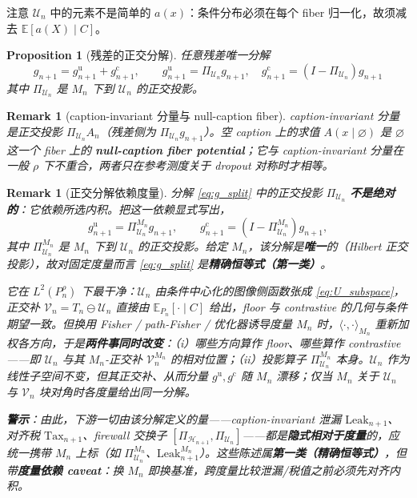 \documentclass[11pt,a4paper]{article}
\newtheorem{proposition}[theorem]{Proposition}
\newtheorem{remark}[theorem]{Remark}
\newcommand{\E}{\mathbb{E}}
\newcommand{\cH}{\mathcal{H}}
\newcommand{\cU}{\mathcal{U}}
\newcommand{\cV}{\mathcal{V}}
\newcommand{\ProjectOp}{\Pi}
\newcommand{\uu}{\mathrm{u}}
\newcommand{\cc}{\mathrm{c}}
\newcommand{\nul}{\varnothing}
\begin{document}
注意 $\cU_n$ 中的元素不是简单的 $a(x)$：条件分布必须在每个 fiber 归一化，故须减去 $\E[a(X)\mid C]$。

\begin{proposition}[残差的正交分解]\label{prop:orthogonal_split}
任意残差唯一分解
\begin{equation}\label{eq:g_split}
\boxed{
g_{n+1} = g^{\uu}_{n+1} + g^{\cc}_{n+1},\qquad g^{\uu}_{n+1}=\ProjectOp_{\cU_n}g_{n+1},\quad g^{\cc}_{n+1}=(I-\ProjectOp_{\cU_n})g_{n+1}
}
\end{equation}
其中 $\ProjectOp_{\cU_n}$ 是 $M_n$ 下到 $\cU_n$ 的正交投影。
\end{proposition}

\begin{remark}[caption-invariant 分量与 null-caption fiber]
caption-invariant 分量是正交投影 $\ProjectOp_{\cU_n}A_n$（残差侧为 $\ProjectOp_{\cU_n}g_{n+1}$）。空 caption 上的求值 $A(x\mid\nul)$ 是 $\nul$ 这一个 fiber 上的 \textbf{null-caption fiber potential}；它与 caption-invariant 分量在一般 $\rho$ 下不重合，两者只在参考测度关于 dropout 对称时才相等。
\end{remark}

\begin{remark}[正交分解依赖度量]\label{rem:metric_proj}
分解 \eqref{eq:g_split} 中的正交投影 $\ProjectOp_{\cU_n}$ \textbf{不是绝对的}：它依赖所选内积。把这一依赖显式写出，
\begin{equation*}
g^{\uu}_{n+1}=\ProjectOp_{\cU_n}^{M_n}g_{n+1},\qquad g^{\cc}_{n+1}=(I-\ProjectOp_{\cU_n}^{M_n})g_{n+1},
\end{equation*}
其中 $\ProjectOp_{\cU_n}^{M_n}$ 是 $M_n$ 下到 $\cU_n$ 的正交投影。给定 $M_n$，该分解是\textbf{唯一}的（Hilbert 正交投影），故对固定度量而言 \eqref{eq:g_split} 是\textbf{精确恒等式（第一类）}。

它在 $L^2(P_n^\rho)$ 下最干净：$\cU_n$ 由条件中心化的图像侧函数张成 \eqref{eq:U_subspace}，正交补 $\cV_n=T_n\ominus\cU_n$ 直接由 $\E_{P_n}[\cdot\mid C]$ 给出，floor 与 contrastive 的几何与条件期望一致。但换用 Fisher / path-Fisher / 优化器诱导度量 $M_n$ 时，$\langle\cdot,\cdot\rangle_{M_n}$ 重新加权各方向，于是\textbf{两件事同时改变}：（i）哪些方向算作 floor、哪些算作 contrastive——即 $\cU_n$ 与其 $M_n$-正交补 $\cV_n^{M_n}$ 的相对位置；（ii）投影算子 $\ProjectOp_{\cU_n}^{M_n}$ 本身。$\cU_n$ 作为线性子空间不变，但其正交补、从而分量 $g^{\uu},g^{\cc}$ 随 $M_n$ 漂移；仅当 $M_n$ 关于 $\cU_n$ 与 $\cV_n$ 块对角时各度量给出同一分解。

\textbf{警示}：由此，下游一切由该分解定义的量——caption-invariant 泄漏 $\mathrm{Leak}_{n+1}$、对齐税 $\mathrm{Tax}_{n+1}$、firewall 交换子 $[\ProjectOp_{\cH_{n+1}},\ProjectOp_{\cU_n}]$——都是\textbf{隐式相对于度量}的，应统一携带 $M_n$ 上标（如 $\ProjectOp_{\cU_n}^{M_n}$、$\mathrm{Leak}_{n+1}^{M_n}$）。这些陈述属\textbf{第一类（精确恒等式）}，但带\textbf{度量依赖 caveat}：换 $M_n$ 即换基准，跨度量比较泄漏/税值之前必须先对齐内积。
\end{remark}
\end{document}
